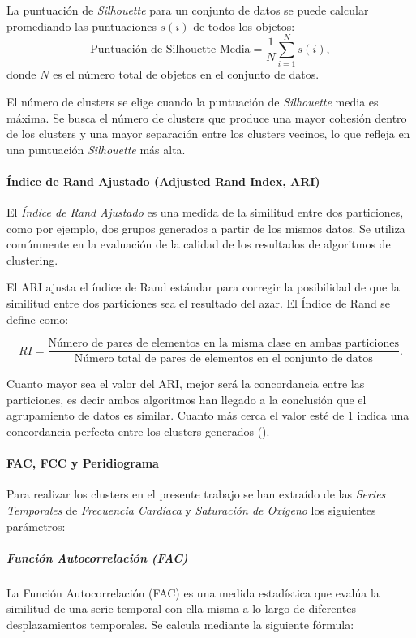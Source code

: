 La puntuación de \textit{Silhouette} para un conjunto de datos se puede calcular promediando las puntuaciones $s(i)$ de todos los objetos:
\[ \text{Puntuación de Silhouette Media} = \frac{1}{N} \sum_{i=1}^{N} s(i), \]
donde \(N\) es el número total de objetos en el conjunto de datos.

El número de clusters se elige cuando la puntuación de \textit{Silhouette} media es máxima. Se busca el número de clusters que produce una mayor cohesión dentro de los clusters y una mayor
separación entre los clusters vecinos, lo que refleja en una puntuación \textit{Silhouette} más alta.

\paragraph{Índice de Rand Ajustado (Adjusted Rand Index, ARI)}\label{sec:ari}

El \textit{Índice de Rand Ajustado} es una medida de la similitud entre dos particiones, como por ejemplo, dos grupos generados a partir de los mismos datos. Se utiliza comúnmente en la evaluación de la calidad de los resultados de algoritmos de clustering. 

El ARI ajusta el índice de Rand estándar para corregir la posibilidad de que la similitud entre dos particiones sea el resultado del azar. El Índice de Rand se define como: 

\[ RI = \frac{\text{Número de pares de elementos en la misma clase en ambas particiones}}{\text{Número total de pares de elementos en el conjunto de datos}} .\]

Cuanto mayor sea el valor del ARI, mejor será la concordancia entre las particiones, es decir ambos algoritmos han llegado a la conclusión que el agrupamiento de datos es similar. Cuanto más cerca el valor esté de 1 indica una concordancia perfecta entre los clusters generados (\cite{rand1971objective}).

\paragraph{FAC, FCC y Peridiograma}\label{sec:fac-fcc-peridiograma}

Para realizar los clusters en el presente trabajo se han extraído de las \textit{Series Temporales} de \textit{Frecuencia Cardíaca} y \textit{Saturación de Oxígeno} los siguientes parámetros:

\subparagraph{Función Autocorrelación (FAC)}

La Función Autocorrelación (FAC) es una medida estadística que evalúa la similitud de una serie temporal con ella misma a lo largo de diferentes desplazamientos temporales. Se calcula mediante la siguiente fórmula:

